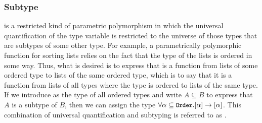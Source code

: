\subsubsection{Subtype}
 is a restricted kind of parametric polymorphism in which the universal quantification of the type variable is restricted to the universe of those types that are subtypes of some other type. For example, a parametrically polymorphic function for sorting lists relies on the fact that the type of the lists is ordered in some way. Thus, what is desired is to express that  is a function from lists of some ordered type to lists of the same ordered type, which is to say that it is a function from lists of all types where the type is ordered to lists of the same type. If we introduce  as the type of all ordered types and write $A \subseteq B$ to express that $A$ is a subtype of $B$, then we can assign  the type $\forall \alpha \subseteq \text{{\small\ttfamily Order}} . [\alpha] \to [\alpha]$. This combination of universal quantification and subtyping is referred to as .
